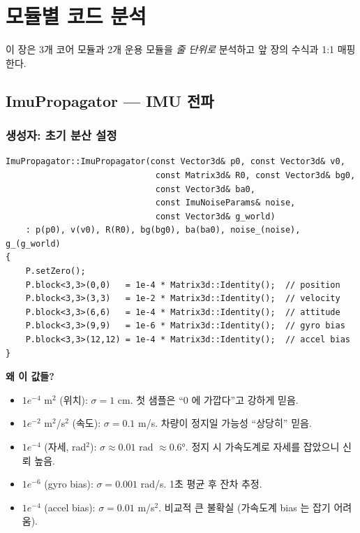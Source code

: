 \documentclass[11pt,a4paper,oneside]{report}
\begin{document}
\chapter{모듈별 코드 분석}

이 장은 3개 코어 모듈과 2개 운용 모듈을 \emph{줄 단위로} 분석하고 앞 장의 수식과 1:1 매핑한다.

\section{ImuPropagator — IMU 전파}

\subsection{생성자: 초기 분산 설정}

\begin{lstlisting}[style=cpp,caption={\texttt{src/ekf/imu\_propagator.cpp:9-25}}]
ImuPropagator::ImuPropagator(const Vector3d& p0, const Vector3d& v0,
                              const Matrix3d& R0, const Vector3d& bg0,
                              const Vector3d& ba0,
                              const ImuNoiseParams& noise,
                              const Vector3d& g_world)
    : p(p0), v(v0), R(R0), bg(bg0), ba(ba0), noise_(noise), g_(g_world)
{
    P.setZero();
    P.block<3,3>(0,0)   = 1e-4 * Matrix3d::Identity();  // position
    P.block<3,3>(3,3)   = 1e-2 * Matrix3d::Identity();  // velocity
    P.block<3,3>(6,6)   = 1e-4 * Matrix3d::Identity();  // attitude
    P.block<3,3>(9,9)   = 1e-6 * Matrix3d::Identity();  // gyro bias
    P.block<3,3>(12,12) = 1e-4 * Matrix3d::Identity();  // accel bias
}
\end{lstlisting}

\textbf{왜 이 값들?}
\begin{itemize}
\item \(1e^{-4}\) m\(^2\) (위치): \(\sigma = 1\) cm. 첫 샘플은 ``\(0\) 에 가깝다''고 강하게 믿음.
\item \(1e^{-2}\) m\(^2\)/s\(^2\) (속도): \(\sigma = 0.1\) m/s. 차량이 정지일 가능성 ``상당히'' 믿음.
\item \(1e^{-4}\) (자세, rad\(^2\)): \(\sigma \approx 0.01\) rad \(\approx 0.6°\). 정지 시 가속도계로 자세를 잡았으니 신뢰 높음.
\item \(1e^{-6}\) (gyro bias): \(\sigma = 0.001\) rad/s. 1초 평균 후 잔차 추정.
\item \(1e^{-4}\) (accel bias): \(\sigma = 0.01\) m/s\(^2\). 비교적 큰 불확실 (가속도계 bias 는 잡기 어려움).
\end{itemize}
\end{document}
